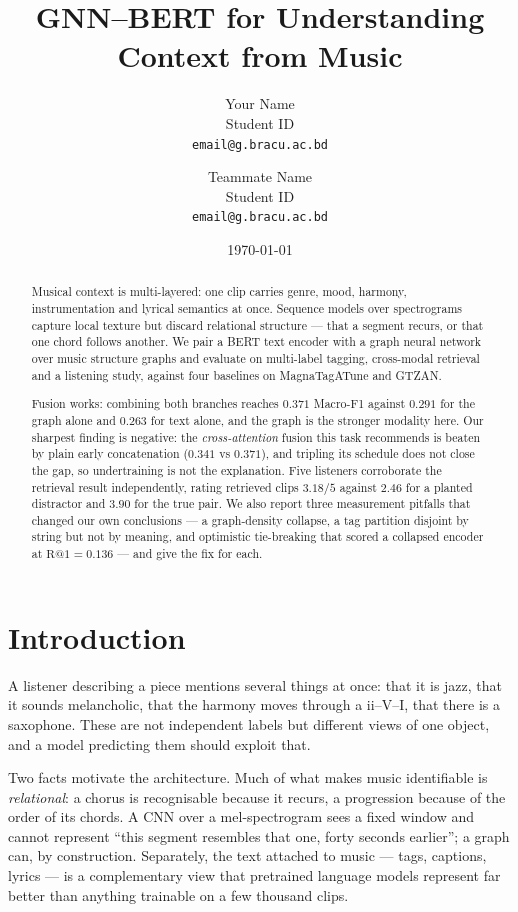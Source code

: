 \documentclass[10pt]{article}
\title{\vspace{-1.2em}GNN--BERT for Understanding Context from Music\vspace{-0.4em}}
\author{%
  Your Name \\ Student ID \\ \texttt{email@g.bracu.ac.bd}
  \and
  Teammate Name \\ Student ID \\ \texttt{email@g.bracu.ac.bd}
}
\date{\today}
\begin{document}
\maketitle
\vspace{-1.5em}

\begin{abstract}
\small
Musical context is multi-layered: one clip carries genre, mood, harmony,
instrumentation and lyrical semantics at once. Sequence models over
spectrograms capture local texture but discard relational structure --- that a
segment recurs, or that one chord follows another. We pair a BERT text encoder
with a graph neural network over music structure graphs and evaluate on
multi-label tagging, cross-modal retrieval and a listening study, against four
baselines on MagnaTagATune and GTZAN.

Fusion works: combining both branches reaches $0.371$ Macro-F1 against $0.291$
for the graph alone and $0.263$ for text alone, and the graph is the stronger
modality here. Our sharpest finding is negative: the \emph{cross-attention}
fusion this task recommends is beaten by plain early concatenation ($0.341$ vs
$0.371$), and tripling its schedule does not close the gap, so undertraining is
not the explanation. Five listeners corroborate the retrieval result
independently, rating retrieved clips $3.18/5$ against $2.46$ for a planted
distractor and $3.90$ for the true pair. We also report three measurement
pitfalls that changed our own conclusions --- a graph-density collapse, a tag
partition disjoint by string but not by meaning, and optimistic tie-breaking
that scored a collapsed encoder at $\text{R@}1=0.136$ --- and give the fix for
each.
\end{abstract}

\vspace{-0.6em}
\section{Introduction}

A listener describing a piece mentions several things at once: that it is jazz,
that it sounds melancholic, that the harmony moves through a ii--V--I, that
there is a saxophone. These are not independent labels but different views of
one object, and a model predicting them should exploit that.

Two facts motivate the architecture. Much of what makes music identifiable is
\emph{relational}: a chorus is recognisable because it recurs, a progression
because of the order of its chords. A CNN over a mel-spectrogram sees a fixed
window and cannot represent ``this segment resembles that one, forty seconds
earlier''; a graph can, by construction. Separately, the text attached to music
--- tags, captions, lyrics --- is a complementary view that pretrained language
models represent far better than anything trainable on a few thousand clips.
\end{document}
